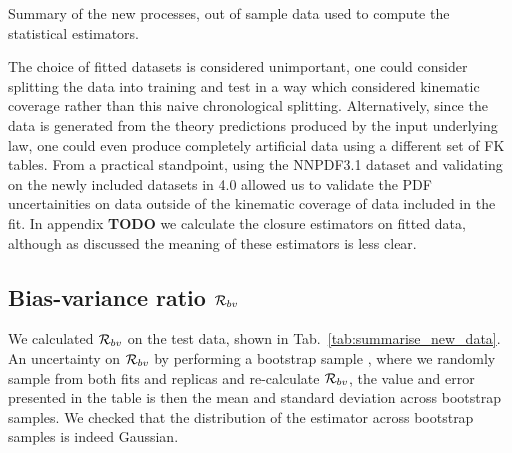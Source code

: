\begin{table}[h!]
    
    \caption{Summary of the new processes, out of sample data used to compute the statistical estimators.}
    \label{tab:summarise_new_data}
\end{table}

The choice of fitted datasets is
considered unimportant, one could consider splitting the data into training
and test in a way which considered kinematic coverage rather than this
naive chronological splitting. Alternatively, since the data is generated from
the theory predictions produced by the input underlying law, one could even
produce completely artificial data using a different set of FK tables. From a
practical standpoint, using the NNPDF3.1 dataset and validating on the newly
included
datasets in 4.0 allowed us to validate the PDF uncertainities on data outside
of the kinematic coverage of data included in the fit. In appendix {\bf TODO}
we calculate the closure estimators on fitted data, although as discussed the
meaning of these estimators is less clear.

\subsection{Bias-variance ratio $\mathcal{R}_{bv}$}

We calculated $\mathcal{R}_{bv}$ on the test data, shown in
Tab.~\ref{tab:summarise_new_data}. An
uncertainty on $\mathcal{R}_{bv}$ by performing a bootstrap sample
\cite{efron1994introduction},
where we randomly sample from both fits and replicas and re-calculate
$\mathcal{R}_{bv}$, the value and error presented in the table is then the mean
and standard deviation across bootstrap samples. We checked that the distribution
of the estimator across bootstrap samples is indeed Gaussian.

